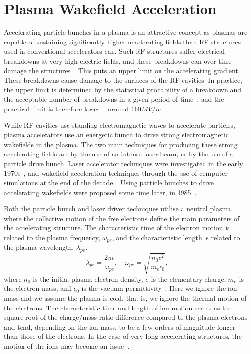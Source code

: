 \section{Plasma Wakefield Acceleration}
\label{Int:PWFA}

Accelerating particle bunches in a plasma is an attractive concept as plasmas are capable of sustaining significantly higher accelerating fields than RF structures used in conventional accelerators can.
Such RF structures suffer electrical breakdowns at very high electric fields, and these breakdowns can over time damage the structures~\cite{braun:2003}.
This puts an upper limit on the accelerating gradient.
These breakdowns cause damage to the surfaces of the RF cavities.
In practice, the upper limit is determined by the statistical probability of a breakdown and the acceptable number of breakdowns in a given period of time~\cite{pritzkau:2002}, and the practical limit is therefore lower -- around $100\unit{MV/m}$~\cite{aicheler:2012}.

While RF cavities use standing electromagnetic waves to accelerate particles, plasma accelerators use an energetic bunch to drive strong electromagnetic wakefields in the plasma.
The two main techniques for producing these strong accelerating fields are by the use of an intense laser beam, or by the use of a particle drive bunch.
Laser accelerator techniques were investigated in the early 1970s~\cite{chan:1971, palmer:1972}, and wakefield acceleration techniques through the use of computer simulations at the end of the decade~\cite{tajima:1979}.
Using particle bunches to drive accelerating wakefields were proposed some time later, in 1985~\cite{chen:1985}.

Both the particle bunch and laser driver techniques utilise a neutral plasma where the collective motion of the free electrons define the main parameters of the accelerating structure.
The characteristic time of the electron motion is related to the plasma frequency, $\omega_{pe}$, and the characteristic length is related to the plasma wavelength, $\lambda_{pe}$.
\begin{equation}
    \lambda_{pe} = \frac{2\pi c}{\omega_{pe}}, \quad
    \omega_{pe}  = \sqrt{\frac{n_{0}e^{2}}{m_{e}\epsilon_{0}}}, \label{EQ:PWFA:L0W0}
\end{equation}
where $n_{0}$ is the initial plasma electron density, $e$ is the elementary charge, $m_{e}$ is the electron mass, and $\epsilon_{0}$ is the vacuum permittivity~\cite{tonks:1929, esarey:1996, pecseli:2012}.
Here we ignore the ion mass and we assume the plasma is cold, that is, we ignore the thermal motion of the electrons.
The characteristic time and length of ion motion scales as the square root of the charge/mass ratio difference compared to the plasma electrons and tend, depending on the ion mass, to be a few orders of magnitude longer than those of the electrons.
In the case of very long accelerating structures, the motion of the ions may become an issue~\cite{rosenzweig:2005}.

